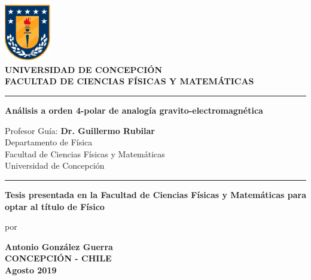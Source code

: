 \thispagestyle{empty}
\pagestyle{empty}
\begin{center}
	\includegraphics[width=2cm]{images/logo_udec}\\
	\vspace{0.3cm}
	\textbf{UNIVERSIDAD DE CONCEPCI\'ON} \\ 
	\textbf{FACULTAD DE CIENCIAS F\'ISICAS Y MATEM\'ATICAS} \\
	\vspace{0.6cm}	
	\rule{14.5cm}{0.1cm}
	\vspace{0.5cm}

	
	{\Large \textbf{Análisis a orden 4-polar de analogía gravito-electromagnética}}
	
	\vspace{1.0cm}
	
	{ Profesor Gu\'ia: \textbf{Dr. Guillermo Rubilar}\\ 
		Departamento de F\'isica \\ 
		Facultad de Ciencias F\'isicas y Matem\'aticas \\
		Universidad de Concepci\'on}
	
	\vspace{0.7cm}
	\rule{14.5cm}{0.1cm}
	\vspace{0.35cm}	
	
	
\textbf{Tesis presentada en la Facultad de Ciencias F\'isicas y Matem\'aticas para optar al t\'itulo de F\'isico}

	\vfill
	por
	
	\textbf{Antonio Gonz\'alez Guerra \\ 
	CONCEPCI\'ON -  CHILE \\
	Agosto 2019}
\end{center}

\thispagestyle{empty}